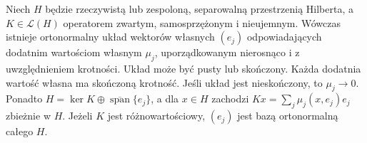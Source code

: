 \begin{twierdzenie}
\label{thm:pde12-compact-spectral}
Niech $H$ będzie rzeczywistą lub zespoloną,
separowalną przestrzenią Hilberta, a $K\in\mathcal L(H)$
operatorem zwartym, samosprzężonym i nieujemnym.
Wówczas istnieje ortonormalny układ wektorów własnych
$(e_j)$ odpowiadających dodatnim wartościom własnym
$\mu_j$, uporządkowanym nierosnąco i z uwzględnieniem
krotności. Układ może być pusty lub skończony.
Każda dodatnia wartość własna ma skończoną krotność.
Jeśli układ jest nieskończony, to $\mu_j\to0$. Ponadto
$H=\ker K\oplus\overline{\operatorname{span}}\{e_j\}$,
a dla $x\in H$ zachodzi
$Kx=\sum_j\mu_j(x,e_j)e_j$ zbieżnie w $H$.
Jeżeli $K$ jest różnowartościowy, $(e_j)$ jest bazą
ortonormalną całego $H$.
\end{twierdzenie}
